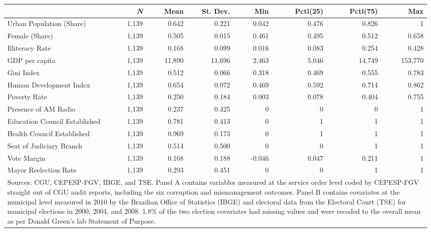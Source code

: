 \documentclass[11pt]{article}
\newcommand\T{\rule{0pt}{2.6ex}}       %
\newcommand\B{\rule[-1.2ex]{0pt}{0pt}} %
\begin{document}
\begin{table}[!htbp]
\begin{tabular}{lrrrrrrr}
  \hline
  & \multicolumn{1}{r}{\emph{N}} & \multicolumn{1}{r}{Mean} & \multicolumn{1}{r}{St. Dev.} & \multicolumn{1}{r}{Min} & \multicolumn{1}{r}{Pctl(25)} & \multicolumn{1}{r}{Pctl(75)} & \multicolumn{1}{r}{Max} \T \B \\
  \hline
  Urban Population (Share)      & 1,139 & 0.642 & 0.221 & 0.042 & 0.476 & 0.826 & 1       \T \B \\
  Female (Share)                & 1,139 & 0.505 & 0.015 & 0.461 & 0.495 & 0.512 & 0.658   \T \B \\
  Illiteracy Rate               & 1,139 & 0.168 & 0.099 & 0.016 & 0.083 & 0.254 & 0.428   \T \B \\
  GDP per capita                & 1,139 & 11,890& 11,696& 2,463 & 5,046 & 14,749& 153,770 \T \B \\
  Gini Index                    & 1,139 & 0.512 & 0.066 & 0.318 & 0.469 & 0.555 & 0.783   \T \B \\
  Human Development Index       & 1,139 & 0.654 & 0.072 & 0.469 & 0.592 & 0.714 & 0.862   \T \B \\
  Poverty Rate                  & 1,139 & 0.250 & 0.184 & 0.003 & 0.078 & 0.404 & 0.755   \T \B \\
  Presence of AM Radio          & 1,139 & 0.237 & 0.425 & 0     & 0     & 0     & 1       \T \B \\
  Education Council Established & 1,139 & 0.781 & 0.413 & 0     & 1     & 1     & 1       \T \B \\
  Health Council Established    & 1,139 & 0.969 & 0.173 & 0     & 1     & 1     & 1       \T \B \\
  Seat of Judiciary Branch      & 1,139 & 0.514 & 0.500 & 0     & 0     & 1     & 1       \T \B \\
  Vote Margin                   & 1,139 & 0.168 & 0.188 & -0.046& 0.047 & 0.211 & 1       \T \B \\
  Mayor Reelection Rate         & 1,139 & 0.293 & 0.451 & 0     & 0     & 1     & 1       \T \B \\
  \hline

  \hline
  \multicolumn{8}{p{\textwidth}}{\footnotesize Sources: CGU, CEPESP-FGV, IBGE, and TSE. Panel A contains variables measured at the service order level coded by CEPESP-FGV straight out of CGU audit reports, including the six corruption and mismanagement outcomes. Panel B contains covariates at the municipal level measured in 2010 by the Brazilian Office of Statistics (IBGE) and electoral data from the Electoral Court (TSE) for municipal elections in 2000, 2004, and 2008. 1.8\% of the two election covariates had missing values and were recoded to the overall mean as per Donald Green's lab Statement of Purpose.} \T
  \end{tabular}
\end{table}
\end{document}

